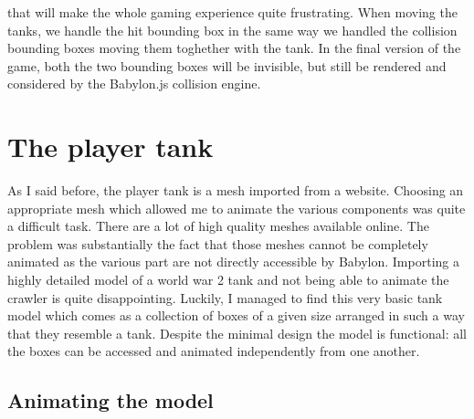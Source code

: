 \documentclass[14pt]{article}
\begin{document}
that will make the whole gaming experience quite frustrating. When moving the tanks, we handle the hit bounding box in the same way we handled the collision bounding boxes moving them toghether with the tank. In the final version of the game, both the two bounding boxes will be invisible, but still be rendered and considered by the Babylon.js collision engine.

\section{The player tank}
As I said before, the player tank is a mesh imported from a website. Choosing an appropriate mesh which allowed me to animate the various components was quite a difficult task. There are a lot of high quality meshes available online. The problem was substantially the fact that those meshes cannot be completely animated as the various part are not directly accessible by Babylon. Importing a highly detailed model of a world war 2 tank and not being able to animate the crawler is quite disappointing. Luckily, I managed to find this very basic tank model which comes as a collection of boxes of a given size arranged in such a way that they resemble a tank. Despite the minimal design the model is functional: all the boxes can be accessed and animated independently from one another.\\
\subsection{Animating the model}
\end{document}
